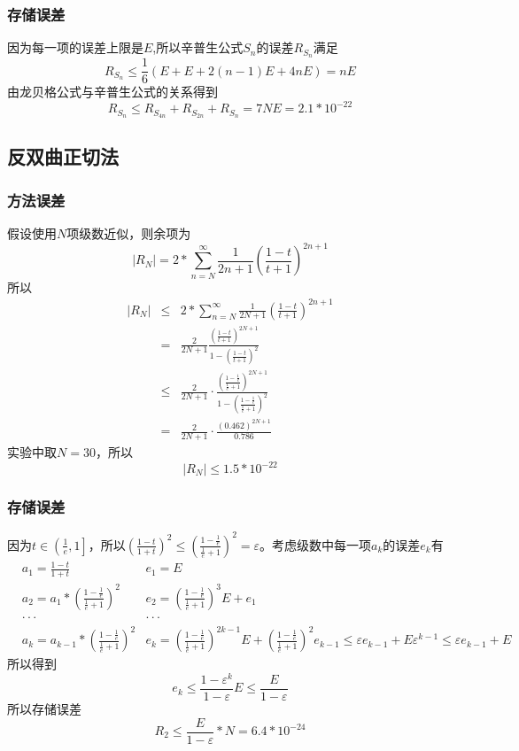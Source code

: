 \documentclass[UTF8,twocolum,titlepage]{ctexart}
\begin{document}
\subsubsection*{存储误差}
因为每一项的误差上限是$E$,所以辛普生公式$S_n$的误差$R_{S_n}$满足$$R_{S_n} \le \frac{1}{6}\left(E+E+2(n-1)E+4nE\right) = nE$$由龙贝格公式与辛普生公式的关系得到$$R_{S_n} \le R_{S_{4n}}+R_{S_{2n}}+R_{S_{n}}=7NE=2.1*10^{-22}$$
\subsection*{反双曲正切法}
\subsubsection*{方法误差}
假设使用$N$项级数近似，则余项为$$\left|R_N\right| =  2*\sum_{n=N}^{\infty}\frac{1}{2n+1}\left(\frac{1-t}{t+1}\right)^{2n+1}$$所以
\begin{eqnarray*}
\left|R_N\right| &\le& 2*\sum_{n=N}^{\infty}\frac{1}{2N+1}\left(\frac{1-t}{t+1}\right)^{2n+1} \\ &=& \frac{2}{2N+1}\frac{\left(\frac{1-t}{t+1}\right)^{2N+1}}{1-\left(\frac{1-t}{t+1}\right)^2}\\&\le& \frac{2}{2N+1}\cdot\frac{\left(\frac{1-\frac{1}{e}}{\frac{1}{e}+1}\right)^{2N+1}}{1-\left(\frac{1-\frac{1}{e}}{\frac{1}{e}+1}\right)^2}\\&=&\frac{2}{2N+1}\cdot\frac{\left(0.462\right)^{2N+1}}{0.786}
\end{eqnarray*}
实验中取$N=30$，所以$$\left|R_N\right| \le 1.5*10^{-22}$$
\subsubsection*{存储误差}
因为$t\in\left(\frac{1}{e},1\right]$，所以$\left(\frac{1-t}{1+t}\right)^2 \le \left(\frac{1-\frac{1}{e}}{\frac{1}{e}+1}\right)^2=\varepsilon$。考虑级数中每一项$a_k$的误差$e_k$有
\begin{eqnarray*}
&a_1=\frac{1-t}{1+t} &e_1=E\\
&a_2=a_1*\left(\frac{1-\frac{1}{e}}{\frac{1}{e}+1}\right)^2 &e_2=\left(\frac{1-\frac{1}{e}}{\frac{1}{e}+1}\right)^3E+e_1\\
&\cdot\cdot\cdot&\cdot\cdot\cdot\\
&a_k=a_{k-1}*\left(\frac{1-\frac{1}{e}}{\frac{1}{e}+1}\right)^2 &e_k=\left(\frac{1-\frac{1}{e}}{\frac{1}{e}+1}\right)^{2k-1}E+\left(\frac{1-\frac{1}{e}}{\frac{1}{e}+1}\right)^2e_{k-1} \le \varepsilon e_{k-1}+E\varepsilon^{k-1} \le \varepsilon e_{k-1}+E
\end{eqnarray*}
所以得到$$e_k \le \frac{1-\varepsilon^k}{1-\varepsilon}E \le \frac{E}{1-\varepsilon}$$所以存储误差$$R_2 \le \frac{E}{1-\varepsilon}*N=6.4*10^{-24}$$
\end{document}
